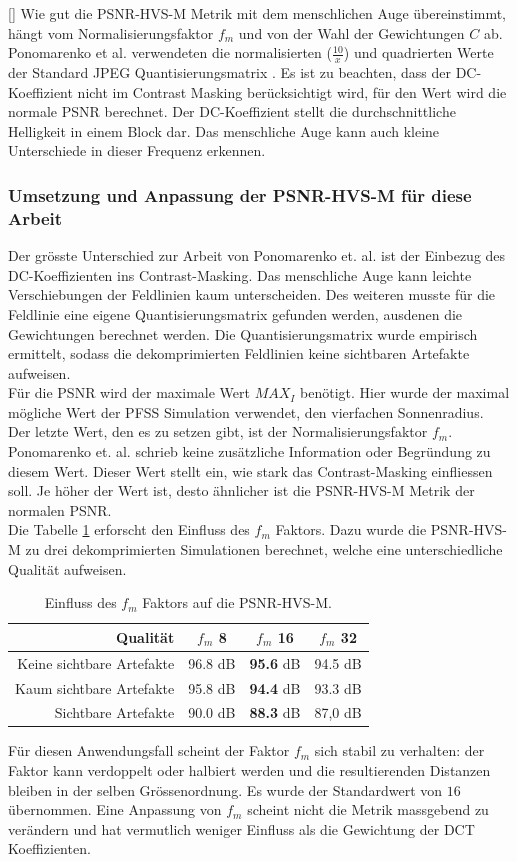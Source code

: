 [\baselineskip]
Wie gut die PSNR-HVS-M Metrik mit dem menschlichen Auge übereinstimmt, hängt vom Normalisierungsfaktor $f_m$ und von der Wahl der Gewichtungen $C$ ab. Ponomarenko et al. verwendeten die normalisierten ($\frac{10}{x}$) und quadrierten Werte der Standard JPEG Quantisierungsmatrix \cite{wallace1992jpeg}. Es ist zu beachten, dass der DC-Koeffizient nicht im Contrast Masking berücksichtigt wird, für den Wert wird die normale PSNR berechnet. Der DC-Koeffizient stellt die durchschnittliche Helligkeit in einem Block dar. Das menschliche Auge kann auch kleine Unterschiede in dieser Frequenz erkennen.

\subsubsection{Umsetzung und Anpassung der PSNR-HVS-M für diese Arbeit}
Der grösste Unterschied zur Arbeit von Ponomarenko et. al. ist der Einbezug des DC-Koeffizienten ins Contrast-Masking. Das menschliche Auge kann leichte Verschiebungen der Feldlinien kaum unterscheiden. Des weiteren musste für die Feldlinie eine eigene Quantisierungsmatrix gefunden werden, ausdenen die Gewichtungen berechnet werden. Die Quantisierungsmatrix wurde empirisch ermittelt, sodass die dekomprimierten Feldlinien keine sichtbaren Artefakte aufweisen.\\
Für die PSNR wird der maximale Wert $MAX_I$ benötigt. Hier wurde der maximal mögliche Wert der PFSS Simulation verwendet, den vierfachen Sonnenradius.\\

Der letzte Wert, den es zu setzen gibt, ist der Normalisierungsfaktor $f_m$. Ponomarenko et. al. schrieb keine zusätzliche Information oder Begründung zu diesem Wert. Dieser Wert stellt ein, wie stark das Contrast-Masking einfliessen soll. Je höher der Wert ist, desto ähnlicher ist die PSNR-HVS-M Metrik der normalen PSNR.\\
Die Tabelle \ref{testsetup:psnr:umsetzung:tabelle:f_m} erforscht den Einfluss des $f_m$ Faktors. Dazu wurde die PSNR-HVS-M zu drei dekomprimierten Simulationen berechnet, welche eine unterschiedliche Qualität aufweisen. 
\begin{table}[!htbp]
\center
\begin{tabular}{r|c|c|c}
	Qualität &$f_m$ 8 &$f_m$ 16 &$f_m$ 32 \\\hline
	Keine sichtbare Artefakte & 96.8 dB & \textbf{95.6} dB& 94.5 dB \\
	Kaum sichtbare Artefakte & 95.8 dB & \textbf{94.4} dB& 93.3 dB\\
  Sichtbare Artefakte & 90.0 dB & \textbf{88.3} dB & 87,0 dB
\end{tabular}
\caption{Einfluss des $f_m$ Faktors auf die PSNR-HVS-M.}
\label{testsetup:psnr:umsetzung:tabelle:f_m}
\end{table}
Für diesen Anwendungsfall scheint der Faktor $f_m$ sich stabil zu verhalten: der Faktor kann verdoppelt oder halbiert werden und die resultierenden Distanzen bleiben in der selben Grössenordnung. Es wurde der Standardwert von $16$ übernommen. Eine Anpassung von $f_m$ scheint nicht die Metrik massgebend zu verändern und hat vermutlich weniger Einfluss als die Gewichtung der DCT Koeffizienten.\\


